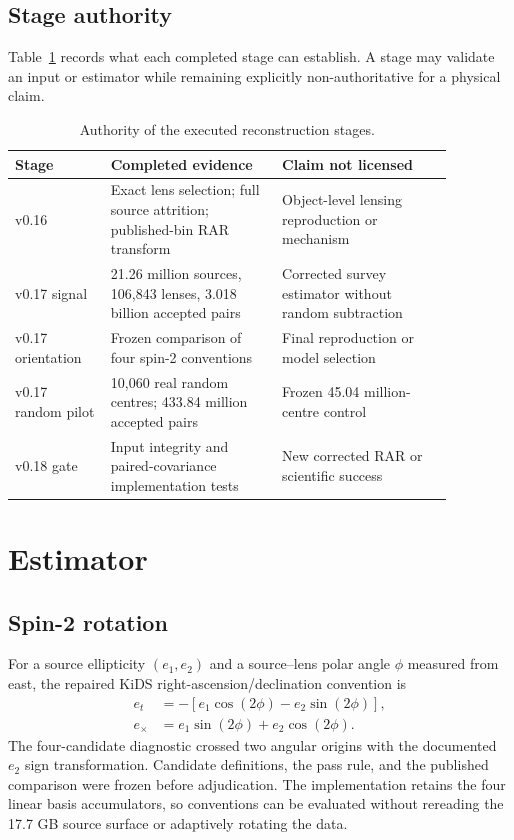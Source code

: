 \documentclass[11pt]{article}
\begin{document}
\subsection{Stage authority}

Table~\ref{tab:authority} records what each completed stage can establish. A
stage may validate an input or estimator while remaining explicitly
non-authoritative for a physical claim.

\begin{table}[ht]
\centering
\caption{Authority of the executed reconstruction stages.}
\label{tab:authority}
\small
\begin{tabular}{p{0.19\linewidth}p{0.34\linewidth}p{0.34\linewidth}}
\toprule
Stage & Completed evidence & Claim not licensed \\
\midrule
v0.16 & Exact lens selection; full source attrition; published-bin RAR transform & Object-level lensing reproduction or mechanism \\
v0.17 signal & 21.26 million sources, 106,843 lenses, 3.018 billion accepted pairs & Corrected survey estimator without random subtraction \\
v0.17 orientation & Frozen comparison of four spin-2 conventions & Final reproduction or model selection \\
v0.17 random pilot & 10,060 real random centres; 433.84 million accepted pairs & Frozen 45.04 million-centre control \\
v0.18 gate & Input integrity and paired-covariance implementation tests & New corrected RAR or scientific success \\
\bottomrule
\end{tabular}
\end{table}

\section{Estimator}

\subsection{Spin-2 rotation}

For a source ellipticity $(e_1,e_2)$ and a source--lens polar angle $\phi$
measured from east, the repaired KiDS right-ascension/declination convention is
\begin{align}
e_t &= -\left[e_1\cos(2\phi)-e_2\sin(2\phi)\right],\\
e_\times &= e_1\sin(2\phi)+e_2\cos(2\phi).
\end{align}
The four-candidate diagnostic crossed two angular origins with the documented
$e_2$ sign transformation. Candidate definitions, the pass rule, and the
published comparison were frozen before adjudication. The implementation
retains the four linear basis accumulators, so conventions can be evaluated
without rereading the 17.7 GB source surface or adaptively rotating the data.
\end{document}
